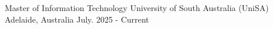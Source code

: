 
\begin{cventries}
  \cventry
    {Master of Information Technology }%
    {University of South Australia (UniSA)
    } %
    {\color{gray}Adelaide, Australia} %
    {July. 2025 - Current} %
    {}
\end{cventries}
